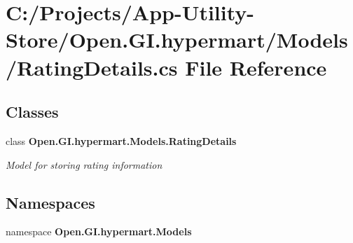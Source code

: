\section{C\+:/\+Projects/\+App-\/\+Utility-\/\+Store/\+Open.G\+I.\+hypermart/\+Models/\+Rating\+Details.cs File Reference}
\label{_rating_details_8cs}
\subsection*{Classes}
\begin{DoxyCompactItemize}
\item 
class \textbf{ Open.\+G\+I.\+hypermart.\+Models.\+Rating\+Details}
\begin{DoxyCompactList}\small\item\em Model for storing rating information \end{DoxyCompactList}\end{DoxyCompactItemize}
\subsection*{Namespaces}
\begin{DoxyCompactItemize}
\item 
namespace \textbf{ Open.\+G\+I.\+hypermart.\+Models}
\end{DoxyCompactItemize}
